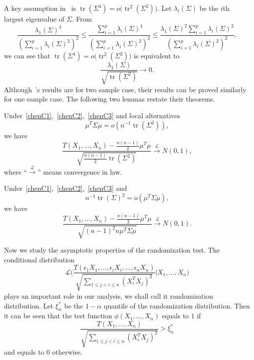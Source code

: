 \documentclass[smallcondensed,final,natbib]{svjour3}          %
\DeclareMathOperator{\mytr}{tr}
\begin{document}
A key assumption in~\citet{Chen2010A} is
    $\mytr (\Sigma^4)=o\big(\mytr ^2(\Sigma^2)\big)$.
    Let $\lambda_i(\Sigma)$ be the $i$th largest eigenvalue of $\Sigma$.
    From
    \begin{equation*}
    \frac{\lambda_1(\Sigma)^4}{(\sum_{i=1}^p \lambda_i(\Sigma)^2)^2}
    \leq
    \frac{\sum_{i=1}^p\lambda_i(\Sigma)^4}{(\sum_{i=1}^p \lambda_i(\Sigma)^2)^2}
    \leq
    \frac{\lambda_1(\Sigma)^2\sum_{i=1}^p\lambda_i(\Sigma)^2}{(\sum_{i=1}^p \lambda_i(\Sigma)^2)^2},
    \end{equation*}
    we can see that 
    $\mytr (\Sigma^4)=o\big(\mytr ^2(\Sigma^2)\big)$ is equivalent to
\begin{equation}\label{chenC3}
    \frac{\lambda_{1}(\Sigma)}{\sqrt{\mytr (\Sigma^2)}}\to 0.
\end{equation}
Although~\citet{Chen2010A}'s results are for two sample case, their results can be proved similarly for one sample case. The following two lemmas restate their theorems.
\begin{lemma}\label{theoremChen}
    Under~\eqref{chenC1},~\eqref{chenC2},~\eqref{chenC3} and local alternatives
    \begin{equation}\label{mu1}
        \mu^T \Sigma\mu=o(n^{-1}\mytr (\Sigma^2)),
    \end{equation}
    we have
        \begin{equation*}
        \frac{T(X_1,\ldots,X_n)-\frac{n(n-1)}{2}\mu^T\mu}{\sqrt{\frac{n(n-1)}{2}\mytr (\Sigma^2)}}\xrightarrow{\mathcal{L}}N(0,1),
        \end{equation*}
        where ``$\xrightarrow{\mathcal{L}}$'' means convergence in law.
\end{lemma}
\begin{lemma}\label{theoremChen2}
    Under~\eqref{chenC1},~\eqref{chenC2},~\eqref{chenC3} and     \begin{equation}\label{mumu1}
     n^{-1}\mytr (\Sigma)^2   =o(\mu^T \Sigma\mu),
    \end{equation}
    we have
        \begin{equation*}
        \frac{T(X_1,\ldots,X_n)-\frac{n(n-1)}{2}\mu^T\mu}{\sqrt{{(n-1)}^2 n \mu^T \Sigma\mu}}\xrightarrow{\mathcal{L}}N(0,1).
        \end{equation*}
\end{lemma}

Now we study the asymptotic properties of the randomization test.
The conditional distribution
        \begin{equation*}
        \mathcal{L}\bigg(\frac{T(\epsilon_1 X_1,\ldots, \epsilon_i X_i,\ldots,\epsilon_n X_n)}{\sqrt{\sum_{1\leq j<i\leq n}{(X_i^T X_j)}^2}}\bigg|X_1,\ldots,X_n\bigg)
        \end{equation*}
 plays an important role in our analysis, we shall call it randomization distribution.
Let $\xi^*_{\alpha}$ be the $1-\alpha$ quantile of the randomization distribution.
Then it can be seen that the test function $\phi(X_1,\ldots,X_n)$ equals to $1$ if
\begin{equation*}
\frac{T(X_1,\ldots, X_n)}{\sqrt{\sum_{1\leq j<i\leq n}{(X_i^T X_j)}^2}}> \xi^*_{\alpha}
\end{equation*}
and equals to $0$ otherwise.
\end{document}
